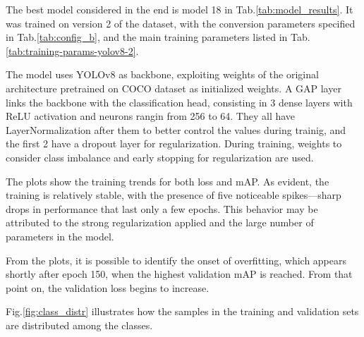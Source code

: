 \documentclass[a4paper,12pt]{article}
\begin{document}

\restoregeometry  %

The best model considered in the end is model 18 in Tab.\ref{tab:model_results}. It was trained on version 2 of the dataset, with the conversion parameters specified in Tab.\ref{tab:config_b}, and the main training parameters listed in Tab.\ref{tab:training-params-yolov8-2}.

The model uses YOLOv8 as backbone, exploiting weights of the original architecture pretrained on COCO dataset as initialized weights. A GAP layer links the backbone with the classification head, consisting in 3 dense layers with ReLU activation and neurons rangin from 256 to 64. They all have LayerNormalization after them to better control the values during trainig, and the first 2 have a dropout layer for regularization.
During training, weights to consider class imbalance and early stopping for regularization are used.

The plots show the training trends for both loss and mAP. As evident, the training is relatively stable, with the presence of five noticeable spikes—sharp drops in performance that last only a few epochs. This behavior may be attributed to the strong regularization applied and the large number of parameters in the model.

From the plots, it is possible to identify the onset of overfitting, which appears shortly after epoch 150, when the highest validation mAP is reached. From that point on, the validation loss begins to increase.

Fig.\ref{fig:class_distr} illustrates how the samples in the training and validation sets are distributed among the classes.
\end{document}
